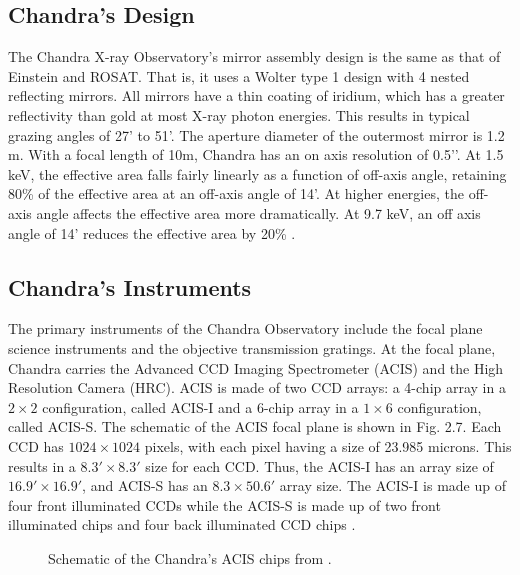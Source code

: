 \subsection{Chandra's Design}

The Chandra X-ray Observatory’s mirror assembly design is the same as that of Einstein and ROSAT.
That is, it uses a Wolter type 1 design with 4 nested reflecting mirrors. 
All mirrors have a thin coating of iridium, which has a greater reflectivity than gold at most  X-ray photon energies. 
This results in typical grazing angles of 27’ to 51’. 
The aperture diameter of the outermost mirror is 1.2 m. 
With a focal length of 10m, Chandra has an on axis resolution of 0.5’’.
At 1.5 keV, the effective area falls fairly linearly as a function of off-axis angle, retaining 80\% of the effective area at an off-axis angle of 14'.
At higher energies, the off-axis angle affects the effective area more dramatically.
At 9.7 keV, an off axis angle of 14' reduces the effective area by 20\% \citep{weisskopf2002}. 

\subsection{Chandra's Instruments}

The primary instruments of the Chandra Observatory include the focal plane science instruments and the objective transmission gratings. 
At the focal plane, Chandra carries the Advanced CCD Imaging Spectrometer (ACIS) and the High Resolution Camera (HRC). 
ACIS is made of two CCD arrays: a 4-chip array in a  $2 \times 2$ configuration, called ACIS-I and a 6-chip array in a $1 \times 6$ configuration, called ACIS-S. 
The schematic of the ACIS focal plane is shown in Fig. 2.7. 
Each CCD has $1024 \times 1024$ pixels, with each pixel having a size of 23.985 microns. This results in a $8.3' \times 8.3'$ size for each CCD. 
Thus, the ACIS-I has an array size of $16.9' \times 16.9'$, and ACIS-S has an $8.3 \times 50.6'$ array size. 
The ACIS-I is made up of four front illuminated CCDs  while the ACIS-S is made up of two front illuminated chips and four back illuminated CCD chips \citep{weisskopf2002}.


\begin{figure}[H]
\centering
{}
\caption{Schematic of the Chandra's ACIS chips from \cite{weisskopf2002}. }
\label{imbeded_fb}
\end{figure}


